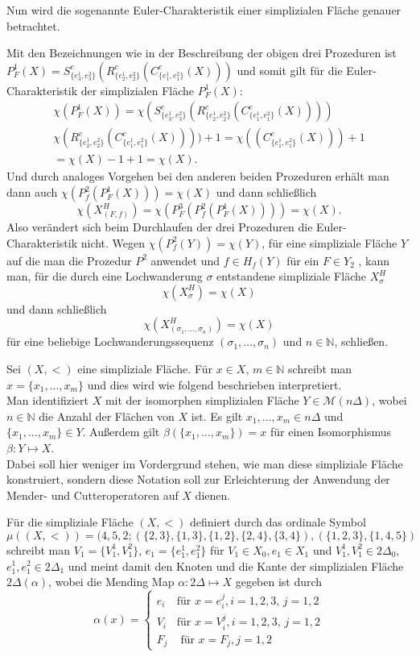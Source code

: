 \documentclass[12pt,titlepage]{article}
\begin{document}
Nun wird die sogenannte Euler-Charakteristik einer simplizialen Fläche genauer betrachtet.

Mit den Bezeichnungen wie in der Beschreibung der obigen drei Prozeduren ist $P_F^1(X)=S^c_{\{e_3^1,e_3^2\}}(R^c_{\{e_2^1,e_2^2\}}(C^c_{\{ e_1^1,e_1^2\} }(X)))$ und somit gilt für die Euler-Charakteristik der simplizialen Fläche $P^1_F(X):$ 
\begin{gather*}
\chi (P^1_F(X))=\chi(S^c_{\{e_3^1,e_3^2\}}(R^c_{\{e_2^1,e_2^2\}}(C^c_{\{ e_1^1,e_1^2\} }(X))))\\
\chi(R^c_{\{e_2^1,e_2^2\}}(C^c_{\{ e_1^1,e_1^2\} }(X))))+1=\chi((C^c_{\{ e_1^1,e_1^2\} }(X)))+1\\
=\chi(X)-1+1=\chi(X).
\end{gather*}
Und durch analoges Vorgehen bei den anderen beiden Prozeduren erhält man dann auch $\chi(P_f^2(P_F^1(X)))=\chi(X)$ und dann schließlich 
\[
\chi(X^H_{(F,f)})=\chi(P^3_F(P_f^2(P_F^1(X))))=\chi(X).
\]
Also verändert sich beim Durchlaufen der drei Prozeduren die Euler-Charakteristik nicht. Wegen $\chi(P^2_f(Y))=\chi(Y)$, für  eine simpliziale Fläche $Y$ auf die man die Prozedur $P^2$ anwendet und $f \in H_f(Y)$ für ein $F\in Y_2$ , kann man, für die durch eine Lochwanderung $\sigma$ entstandene simpliziale Fläche $X^H_{\sigma}$
\[
\chi(X^H_{\sigma})=\chi(X)
\]
und dann schließlich
\[
\chi (X_{(\sigma_1,\ldots, \sigma_n)}^H)=\chi(X)
\]
für eine beliebige Lochwanderungssequenz $(\sigma_1,\ldots, \sigma_n)$ und $n\in \mathbb{N}$, schließen.
\begin{bemerkung}
Sei $(X,<)$ eine simpliziale Fläche.
Für $x\in X$, $m \in \mathbb{N}$ schreibt man $x=\{x_1,\ldots,x_m\}$ und dies wird wie folgend beschrieben interpretiert.\\ Man identifiziert $X$ mit der isomorphen simplizialen Fläche $Y \in \mathcal{M}(n \Delta)$, wobei $n\in \mathbb{N}$ die Anzahl der Flächen von $X$ ist. Es gilt $x_1,\ldots,x_m \in n\Delta$ und $\{x_1,\ldots,x_m\}\in Y$. Außerdem gilt $\beta(\{x_1,\ldots,x_m\})=x$ für einen  Isomorphismus $\beta: Y \mapsto X$. \\
Dabei soll hier weniger im Vordergrund stehen, wie man diese simpliziale Fläche konstruiert, sondern diese Notation soll zur Erleichterung der Anwendung der Mender- und Cutteroperatoren auf $X$ dienen.
\end{bemerkung}

\begin{bsp}
Für die simpliziale Fläche $(X,<)$ definiert durch das ordinale Symbol 
\[
\mu((X,<))=(4,5,2;(\{2,3\},\{1,3\},\{1,2\},\{2,4\},\{3,4\}),(\{1,2,3\},\{1,4,5\})
\]
schreibt man $V_1=\{V_1^1,V_1^2\}$, $e_1=\{e_1^1,e_1^2\}$ für $V_1\in X_0,e_1 \in X_1$ und $V_1^1,V_1^2 \in 2 \Delta_0$, $e_1^1,e_1^2 \in 2 \Delta_1$ und meint damit den Knoten und die Kante der simplizialen Fläche $2\Delta(\alpha)$, wobei die Mending Map $\alpha:2\Delta \mapsto X$ gegeben ist durch
\[
\alpha(x)= 
\begin{cases}
e_i & \text{für } x =e_i^j ,i=1,2,3,\,j=1,2\\
V_i &\text{für } x =V_i^j,i=1,2,3,\,j=1,2\\
F_j & \text{ für } x=F_j, j=1,2
\end{cases}
\]
\end{bsp}
\end{document}
